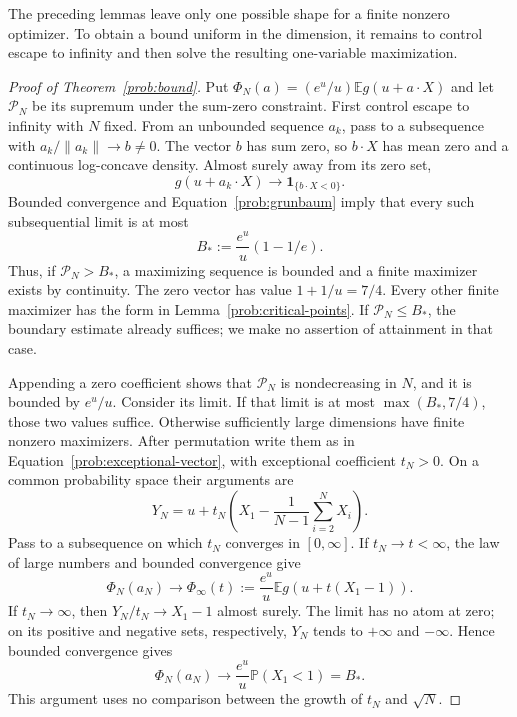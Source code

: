The preceding lemmas leave only one possible shape for a finite
nonzero optimizer. To obtain a bound uniform in the dimension, it
remains to control escape to infinity and then solve the resulting
one-variable maximization.



\begin{proof}[Proof of Theorem~\ref{prob:bound}]
Put $\Phi_N(a)=(e^u/u)\mathbb E g(u+a\cdot X)$ and let
$\mathcal P_N$ be its supremum under the sum-zero constraint. First
control escape to infinity with $N$ fixed. From an unbounded sequence
$a_k$, pass to a subsequence with
$a_k/\|a_k\|\to b\ne0$. The vector $b$ has sum zero, so $b\cdot X$
has mean zero and a continuous log-concave density. Almost surely
away from its zero set,
\[
 g(u+a_k\cdot X)\longrightarrow\mathbf1_{\{b\cdot X<0\}}.
\]
Bounded convergence and Equation~\eqref{prob:grunbaum} imply that every
such subsequential limit is at most
\begin{equation}\label{prob:boundary-value}
 B_*:=\frac{e^u}{u}(1-1/e).
\end{equation}
Thus, if $\mathcal P_N>B_*$, a maximizing sequence is bounded and a
finite maximizer exists by continuity. The zero vector has value
$1+1/u=7/4$. Every other finite maximizer has the form in
Lemma~\ref{prob:critical-points}. If $\mathcal P_N\le B_*$, the boundary
estimate already suffices; we make no assertion of attainment in
that case.

Appending a zero coefficient shows that $\mathcal P_N$ is
nondecreasing in $N$, and it is bounded by $e^u/u$. Consider its limit.
If that limit is at most $\max(B_*,7/4)$, those two values suffice.
Otherwise sufficiently large dimensions have finite nonzero
maximizers. After permutation write them as in
Equation~\eqref{prob:exceptional-vector}, with exceptional coefficient
$t_N>0$. On a common probability space their arguments are
\[
 Y_N=u+t_N\left(X_1-\frac1{N-1}\sum_{i=2}^NX_i\right).
\]
Pass to a subsequence on which $t_N$ converges in $[0,\infty]$.
If $t_N\to t<\infty$, the law of large numbers and bounded convergence
give
\[
 \Phi_N(a_N)\longrightarrow
 \Phi_\infty(t):=\frac{e^u}{u}\mathbb E g(u+t(X_1-1)).
\]
If $t_N\to\infty$, then $Y_N/t_N\to X_1-1$ almost surely. The limit
has no atom at zero; on its positive and negative sets, respectively,
$Y_N$ tends to $+\infty$ and $-\infty$. Hence bounded convergence gives
\[
 \Phi_N(a_N)\longrightarrow
       \frac{e^u}{u}\mathbb P(X_1<1)=B_*.
\]
This argument uses no comparison between the growth of $t_N$ and
$\sqrt N$.


\end{proof}
